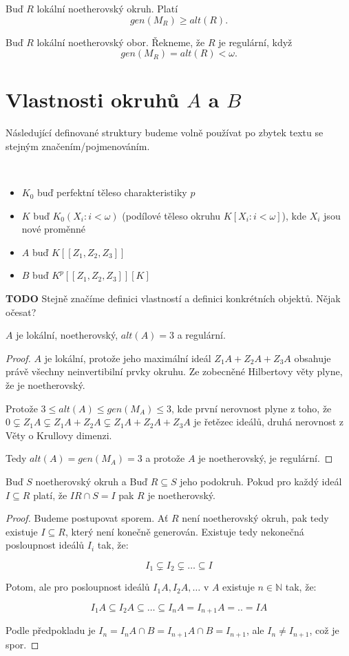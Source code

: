 \documentclass[11pt,a4paper]{article}
\newcommand\m[1]{\mathbb { #1 }} %
\theoremstyle{definition}
\theoremstyle{plain}
\begin{document}
 Buď $R$ lokální noetherovský okruh. Platí
	$$gen(M_R) \geq alt(R).$$

 Buď $R$ lokální noetherovský obor. Řekneme, že $R$ je regulární, když
	$$gen(M_R) = alt(R) < \omega.$$
	
\section{Vlastnosti okruhů $A$ a $B$}
Následující definované struktury budeme volně používat po zbytek textu se
stejným značením/pojmenováním.

 ~\\[-1.5em]
\begin{itemize}
	\item $K_0$ buď perfektní těleso charakteristiky $p$
	\item $K$ buď $K_0(X_i : i < \omega)$ (podílové těleso okruhu $K[X_i : i < \omega]$), kde $X_i$ jsou nové proměnné
	\item $A$ buď $K[[Z_1,Z_2,Z_3]]$
	\item $B$ buď $K^p[[Z_1,Z_2,Z_3]][K]$
\end{itemize}
\textbf{TODO} Stejně značíme definici vlastností a definici konkrétních
objektů. Nějak očesat?


\veta $A$ je lokální, noetherovský, $alt(A) = 3$ a regulární.
\begin{proof}
	$A$ je lokální, protože jeho maximální ideál $Z_1A + Z_2A + Z_3A$ obsahuje
	právě všechny neinvertibilní prvky okruhu. Ze zobecněné Hilbertovy věty
	plyne, že je noetherovský.

	Protože $3 \leq alt(A) \leq gen(M_A) \leq 3$, kde první nerovnost plyne z
	toho, že $0 \subsetneq Z_1A \subsetneq Z_1A + Z_2A \subsetneq Z_1A + Z_2A +
	Z_3A$ je řetězec ideálů, druhá nerovnost z Věty o Krullovy dimenzi.

	Tedy $alt(A) = gen(M_A) = 3$ a protože $A$ je noetherovský, je regulární.
\end{proof}

\lemma Buď $S$ noetherovský okruh a Buď $R \subseteq S$ jeho podokruh. Pokud
pro každý ideál $I \subseteq R$ platí, že $IR \cap S = I$ pak $R$ je
noetherovský.
\begin{proof}
	Budeme postupovat sporem. Ať $R$ není noetherovský okruh, pak tedy existuje
	$I \subseteq R$, který není konečně generován. Existuje tedy nekonečná
	posloupnost ideálů $I_i$ tak, že:

	$$I_1 \subsetneq I_2 \subsetneq \dots \subseteq I$$

	\noindent Potom, ale pro posloupnost ideálů $I_1A, I_2A, \dots$ v $A$
	existuje $n \in \m N$ tak, že:

	$$I_1A \subseteq I_2A \subseteq \dots \subseteq I_nA = I_{n+1}A = .. = IA$$

	\noindent Podle předpokladu je $I_n = I_nA \cap B = I_{n+1}A \cap B =
	I_{n+1}$, ale $I_n \not= I_{n+1}$, což je spor.
\end{proof}
\end{document}
